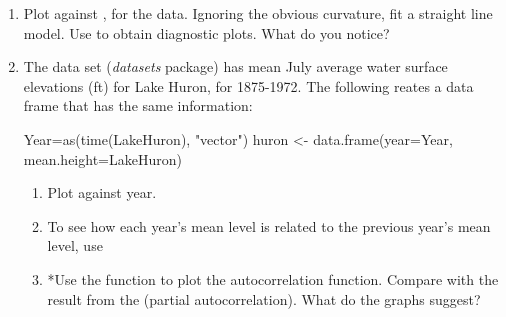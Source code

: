 \begin{enumerate}

\item Plot  against , for the
   data.  Ignoring the obvious curvature, fit a
  straight line model. Use  to obtain diagnostic
  plots.  What do you notice?
\item The data set  (\textit{datasets} package) has
  mean July average water surface elevations (ft) for Lake Huron, for
  1875-1972. The following reates a data frame that has the
  same information:
\begin{Schunk}
\begin{Sinput}
Year=as(time(LakeHuron), "vector")
huron <- data.frame(year=Year, mean.height=LakeHuron)
\end{Sinput}
\end{Schunk}
\begin{enumerate}
\item Plot  against year.

\item To see how each year's mean level is related
to the previous year's mean level, use
\begin{Schunk}
\end{Schunk}

\item *Use the function  to plot the autocorrelation
function.  Compare with the result from the  (partial
autocorrelation).  What do the graphs suggest?
\end{enumerate}
\end{enumerate}
